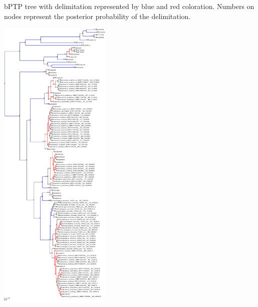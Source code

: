\documentclass[11pt]{article}
\begin{document}
\begin{suppfigure}
\centering
\caption{
bPTP tree with delimitation represented by blue and red coloration. Numbers on nodes represent the posterior probability of the delimitation.
}
\includegraphics[width=0.4\textwidth]{supplementaryinfo/bptp.pdf}
\label{fig:genetree5}
\end{suppfigure}
\clearpage
\end{document}
